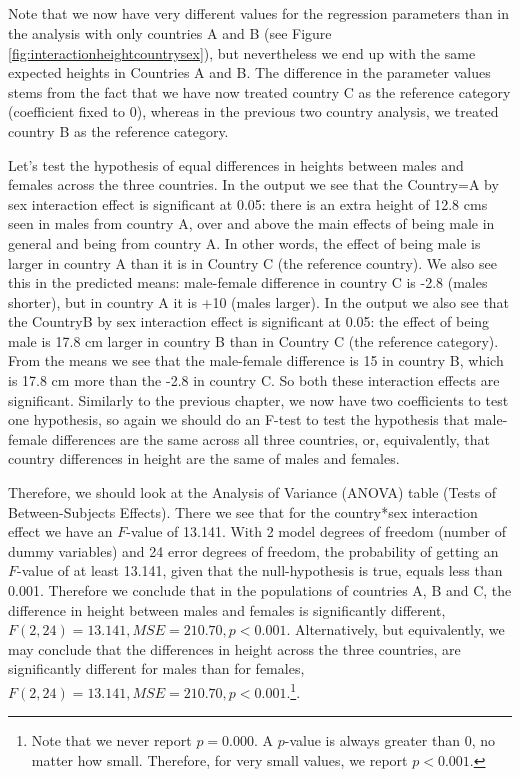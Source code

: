 \\
\\
\\
\\
Note that we now have very different values for the regression parameters than in the analysis with only countries A and B (see Figure \ref{fig:interactionheightcountrysex}), but nevertheless we end up with the same expected heights in Countries A and B. The difference in the parameter values stems from the fact that we have now treated country C as the reference category (coefficient fixed to 0), whereas in the previous two country analysis, we treated country B as the reference category. 

Let's test the hypothesis of equal differences in heights between males and females across the three countries. In the output we see that the Country=A by sex interaction effect is significant at 0.05: there is an extra height of 12.8 cms seen in males from country A, over and above the main effects of being male in general and being from country A. In other words, the effect of being male is larger in country A than it is in Country C (the reference country). We also see this in the predicted means: male-female difference in country C is -2.8 (males shorter), but in country A it is +10 (males larger). In the output we also see that the CountryB by sex interaction effect is significant at 0.05: the effect of being male is 17.8 cm larger in country B than in Country C (the reference category). From the means we see that the male-female difference is 15 in country B, which is 17.8 cm more than the -2.8 in country C. So both these interaction effects are significant. Similarly to the previous chapter, we now have two coefficients to test one hypothesis, so again we should do an F-test to test the hypothesis that male-female differences are the same across all three countries, or, equivalently, that country differences in height are the same of males and females.



Therefore, we should look at the Analysis of Variance (ANOVA) table (Tests of Between-Subjects Effects). There we see that for the country*sex interaction effect we have an $F$-value of 13.141. With 2 model degrees of freedom (number of dummy variables) and 24 error degrees of freedom, the probability of getting an $F$-value of at least 13.141, given that the null-hypothesis is true, equals less than 0.001. Therefore we conclude that in the populations of countries A, B and C, the difference in height between males and females is significantly different, $F(2,24)=13.141, MSE=210.70, p < 0.001$. Alternatively, but equivalently, we may conclude that the differences in height across the three countries, are significantly different for males than for females, $F(2,24)=13.141, MSE=210.70, p < 0.001$.\footnote{Note that we never report $p=0.000$. A $p$-value is always greater than 0, no matter how small. Therefore, for very small values, we report $p < 0.001$.}. 



